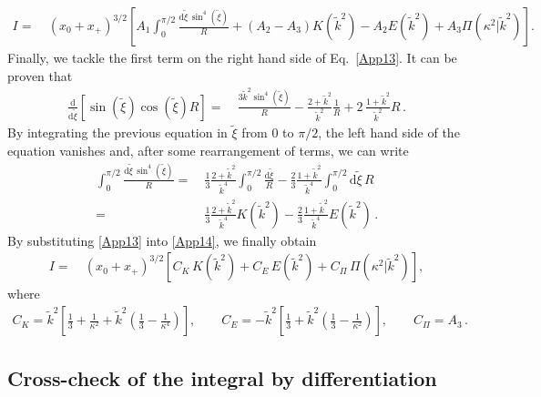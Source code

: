 \documentclass[aps,nofootinbib,prd,superscriptaddress,eqsecnum,showpacs,showkeys,preprintnumbers,altaffilletter]{revtex4}
\def\D{\mathrm{d}}
\newcommand{\nn}{\nonumber}
\newcommand{\txi}{\tilde{\xi}}
\begin{document}
\begin{align}
	\label{App13}
	I
	= &~ 
	\left(x_0+x_+\right)^{3/2}\left[
	A_1 \int_0^{\pi/2} \frac{\D \txi\,\sin^4(\txi) }{R}  
	+\left(A_2- A_3\right)  K(\tilde{k}^2)
	- A_2 E(\tilde{k}^2)
	+ A_3 \Pi(\kappa^2|\tilde{k}^2)
	\right].
\end{align}
Finally, we tackle the first term on the right hand side of Eq.~\eqref{App13}. It can be proven that 
\begin{align}
	\frac{\D }{\D \txi} \left[\sin(\txi)\cos(\txi) R\right]
	= &~
	\frac{3 \tilde{k}^2 \sin^4(\txi)}{R}
	- \frac{2+ \tilde{k}^{2} }{\tilde{k}^2} \frac{1}{R}
	+ 2\,\frac{1+\tilde{k}^{2}}{\tilde{k}^2} R
	\,.
\end{align}
By integrating the previous equation in $\txi$ from $0$ to $\pi/2$, the left hand side of the equation vanishes and, after some rearrangement of terms, we can write
\begin{align}
	\label{App14}
	 \int_0^ {\pi/2} \frac{\D\txi \, \sin^4(\txi)}{R}
	=&~  
	\frac{1}{3}\frac{2 + \tilde{k}^{2}}{\tilde{k}^4} \int_0^ {\pi/2} \frac{\D\txi}{R}
	- \frac{2}{3}\frac{1+\tilde{k}^{2}}{\tilde{k}^4} \int_0^ {\pi/2}  \D\txi\,R
	\nn\\
	=&~ 
	\frac{1}{3}\frac{2 + \tilde{k}^{2}}{\tilde{k}^4} K(\tilde{k}^2)
	- \frac{2}{3}\frac{1+\tilde{k}^{2}}{\tilde{k}^4} E(\tilde{k}^2)
	\,.
\end{align}
By substituting \eqref{App13} into \eqref{App14}, we finally obtain
\begin{align}
	I
	= &~ 
	\left(x_0+x_+\right)^{3/2}
	\left[
	C_K\,  K(\tilde{k}^2)
	+ C_E\, E(\tilde{k}^2)
	+ C_\Pi\, \Pi(\kappa^2|\tilde{k}^2)
	\right],
\end{align}
where
\begin{align}
	C_K = \tilde{k}^2\left[
		\frac{1}{3}+\frac{1}{\kappa^2} 
		+ \tilde{k}^2\left(\frac{1}{3}-\frac{1}{\kappa^4}\right)
	\right],
	\qquad
	C_E = - \tilde{k}^2\left[
		\frac{1}{3}
		+ \tilde{k}^2\left(\frac{1}{3} - \frac{1}{\kappa^2} \right)
	\right],
	\qquad
	C_\Pi=A_3
	\,.
\end{align}

%
%

\subsection{Cross-check of the integral by differentiation}
\label{App_crosscheck}
\end{document}
